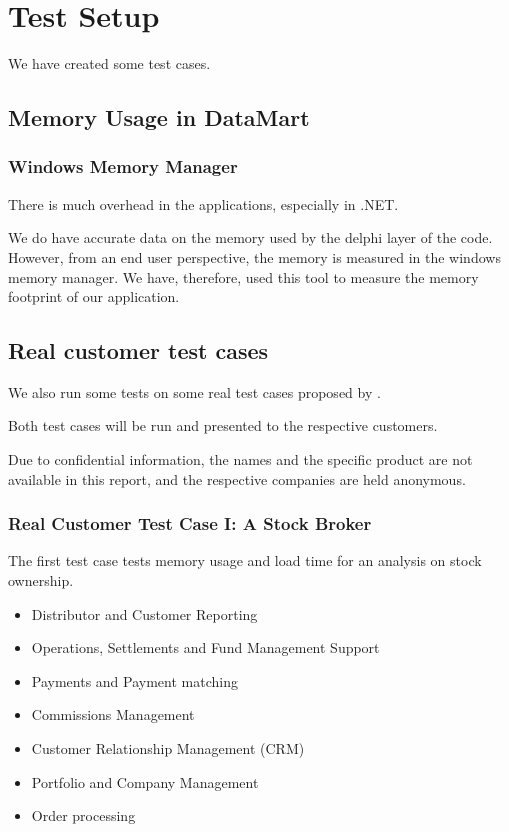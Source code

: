 \chapter{Test Setup}
\label{chap:Test Setup}
We have created some test cases.

\section{Memory Usage in DataMart}
\label{sec:Memory Usage in DataMart}

\subsection{Windows Memory Manager}
\label{sub:Windows Memory Manager}
There is much overhead in the applications, especially in .NET.

We do have accurate data on the memory used by the delphi layer of the code. However, from an end user perspective, the memory is measured in the windows memory manager. We have, therefore, used this tool to measure the memory footprint of our application.


\section{Real customer test cases}
\label{sec:Real customer test cases}
We also run some tests on some real test cases proposed by \genus.

Both test cases will be run and presented to the respective customers.

Due to confidential information, the names and the specific product are not available in this report, and the respective companies are held anonymous.

\subsection{Real Customer Test Case I: A Stock Broker}
\label{sub:Real Customer Test Case I: A Stock Broker}
The first test case tests memory usage and load time for an analysis on stock ownership.
\begin{itemize}
    \item Distributor and Customer Reporting
    \item Operations, Settlements and Fund Management Support
    \item Payments and Payment matching
    \item Commissions Management
    \item Customer Relationship Management (CRM)
    \item Portfolio and Company Management
    \item Order processing
\end{itemize}

